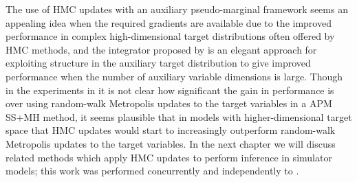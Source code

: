 The use of \ac{HMC} updates with an auxiliary pseudo-marginal framework seems an appealing idea when the required gradients are available due to the improved performance in complex high-dimensional target distributions often offered by \ac{HMC} methods, and the integrator proposed by \citep{lindsten2016pseudo} is an elegant approach for exploiting structure in the auxiliary target distribution to give improved performance when the number of auxiliary variable dimensions is large. Though in the experiments in \citep{lindsten2016pseudo} it is not clear how significant the gain in performance is over using random-walk Metropolis updates to the target variables in a \ac{APM} \ac{SS}+\ac{MH} method, it seems plausible that in models with higher-dimensional target space that \ac{HMC} updates would start to increasingly outperform random-walk Metropolis updates to the target variables. In the next chapter we will discuss related methods which apply \ac{HMC} updates to perform inference in simulator models; this work was performed concurrently and independently to \citep{lindsten2016pseudo}. 





